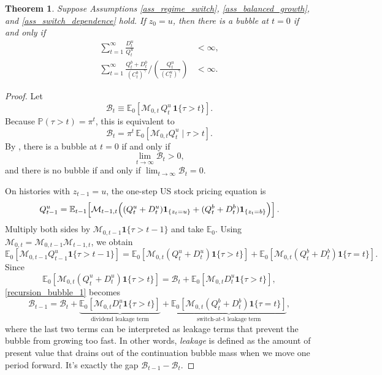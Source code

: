 \documentclass[12pt]{article}
\theoremstyle{plain}
\newtheorem{thm}{Theorem}
\begin{document}
\begin{thm}\label{thm_1}
Suppose Assumptions \ref{ass_regime_switch}, \ref{ass_balanced_growth}, and \ref{ass_switch_dependence} hold. If $z_0=u$, then there is a bubble at $t=0$ if and only if
\begin{subequations}\label{thm_cond1}
\begin{align}
\sum_{t=1}^\infty \frac{D_t^u}{Q_t^u}&<\infty, \label{thm_cond_1a}\\
\sum_{t=1}^\infty
{\frac{Q_t^b+D_t^b}{(C_t^b)^\gamma}}\big/\left({\frac{Q_t^u}{(C_t^u)^\gamma}}\right)&<\infty. \label{thm_cond_1b}
\end{align}
\end{subequations}
\end{thm}
\begin{proof}
Let
\[
\mathcal B_t \equiv \mathbb E_0\!\left[\mathcal M_{0,t}\,Q_t^u\,\mathbf 1\{\tau>t\}\right].
\]
Because $\mathbb P(\tau>t)=\pi^t$, this is equivalent to
\[
\mathcal B_t
=
\pi^t\,\mathbb E_0\!\left[\mathcal M_{0,t}Q_t^u\mid \tau>t\right].
\]
By , there is a bubble at $t=0$ if and only if
\[
\lim_{t\to\infty}\mathcal B_t>0,
\]
and there is no bubble if and only if $\lim_{t\to\infty}\mathcal B_t=0$.

On histories with $z_{t-1}=u$, the one-step US stock pricing equation is
\[
Q_{t-1}^u
=
\mathbb E_{t-1}\!\left[
\mathcal M_{t-1,t}
\Bigl(
(Q_t^u+D_t^u)\mathbf 1_{\{z_t=u\}}
+
(Q_t^b+D_t^b)\mathbf 1_{\{z_t=b\}}
\Bigr)
\right].
\]
Multiply both sides by $\mathcal M_{0,t-1}\mathbf 1\{\tau>t-1\}$ and take $\mathbb E_0$. Using
$\mathcal M_{0,t}=\mathcal M_{0,t-1}\mathcal M_{t-1,t}$, we obtain
\begin{equation}\label{recursion_bubble_1}
\mathbb E_0\!\left[\mathcal M_{0,t-1}Q_{t-1}^u\mathbf 1\{\tau>t-1\}\right]
=
\mathbb E_0\!\left[\mathcal M_{0,t}(Q_t^u+D_t^u)\mathbf 1\{\tau>t\}\right]
+
\mathbb E_0\!\left[\mathcal M_{0,t}(Q_t^b+D_t^b)\mathbf 1\{\tau=t\}\right].
\end{equation}
Since
\[
\mathbb E_0\!\left[\mathcal M_{0,t}(Q_t^u+D_t^u)\mathbf 1\{\tau>t\}\right]
=
\mathcal B_t+\mathbb E_0\!\left[\mathcal M_{0,t}D_t^u\mathbf 1\{\tau>t\}\right],
\]
\eqref{recursion_bubble_1} becomes
\begin{equation}\label{bubble_recursion_2}
\mathcal B_{t-1}
=
\mathcal B_t
+\underbrace{\mathbb E_0\!\left[\mathcal M_{0,t}D_t^u\mathbf 1\{\tau>t\}\right]}_{\text{dividend leakage term}}
+\underbrace{\mathbb E_0\!\left[\mathcal M_{0,t}(Q_t^b+D_t^b)\mathbf 1\{\tau=t\}\right]}_{
	\text{switch-at-t leakage term}},
\end{equation}
where the last two terms can be interpreted as leakage terms that prevent the bubble from growing too fast. 
In other words, \textit{leakage} is defined as the amount of present value that drains out of the 
continuation bubble mass when we move one period forward. It’s exactly the gap $\mathcal  B_{t-1}-\mathcal B_t$.


\end{proof}
\end{document}
